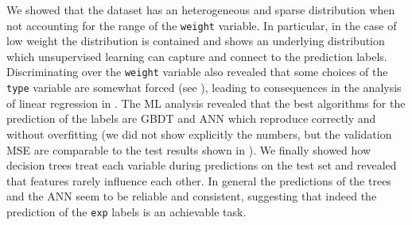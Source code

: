 We showed that the dataset has an heterogeneous and sparse distribution when
not accounting for the range of the \texttt{weight} variable.
In particular, in the case of low weight the distribution is contained and
shows an underlying distribution which unsupervised learning can capture and
connect to the prediction labels.
Discriminating over the \texttt{weight} variable also revealed that some
choices of the \texttt{type} variable are somewhat forced (see
), leading to consequences in the analysis of linear
regression in .
The ML analysis revealed that the best algorithms for the prediction of the
labels are GBDT and ANN which reproduce correctly and without overfitting (we
did not show explicitly the numbers, but the validation MSE are comparable to
the test results shown in ).
We finally showed how decision trees treat each variable during predictions on
the test set and revealed that features rarely influence each other.
In general the predictions of the trees and the ANN seem to be reliable and
consistent, suggesting that indeed the prediction of the \texttt{exp} labels is
an achievable task.
